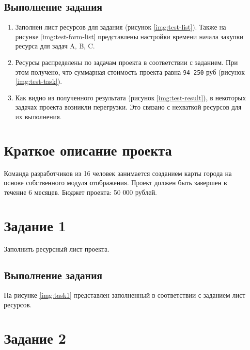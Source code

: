 \subsection{Выполнение задания}

\begin{enumerate}
    \item Заполнен лист ресурсов для задания (рисунок \ref{img:test-list}). Также на рисунке \ref{img:test-form-list} представлены настройки времени начала закупки ресурса для задач A, B, C.

    \item Ресурсы распределены по задачам проекта в соответствии с заданием. При этом получено, что суммарная стоимость проекта равна \texttt{94 250} руб (рисунок \ref{img:test-task}).

    \item Как видно из полученного результата (рисунок \ref{img:test-result}), в некоторых задачах проекта возникли перегрузки. Это связано с нехваткой ресурсов для их выполнения.
\end{enumerate}


\section{Краткое описание проекта}

Команда разработчиков из 16 человек занимается созданием карты города на основе собственного модуля отображения. Проект должен быть завершен в течение 6 месяцев. Бюджет проекта: 50 000 рублей.


\section{Задание 1}

Заполнить ресурсный лист проекта.

\subsection{Выполнение задания}

На рисунке \ref{img:task1} представлен заполненный в соответствии с заданием лист ресурсов.



\section{Задание 2}

